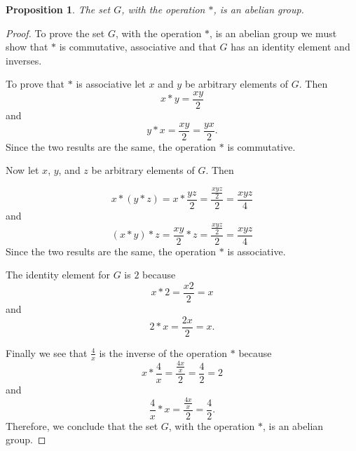 \documentclass[12pt]{article}   %
\newtheorem*{proposition}{Proposition}  %
\begin{document}
\begin{proposition}
The set $G$, with the operation $\ast$, is an abelian group.
\end{proposition}
\begin{proof}
To prove the set $G$, with the operation $\ast$, is an abelian group we must show that $\ast$ is commutative, associative and that $G$ has an identity element and inverses.

To prove that $*$ is associative let $x$ and $y$ be arbitrary elements of $G$. Then
\begin{equation*}
x * y = \frac{xy}{2}
\end{equation*}
and
\begin{equation*}
y * x = \frac{xy}{2} = \frac{yx}{2}.
\end{equation*}
Since the two results are the same, the operation $\ast$ is commutative.

Now let $x$, $y$, and $z$ be arbitrary elements of $G$. Then

\begin{equation*}
x * (y * z) = x * \frac{yz}{2} = \frac{\frac{xyz}{2}}{2} = \frac{xyz}{4}
\end{equation*}
and
\begin{equation*}
(x * y) * z = \frac{xy}{2} * z = \frac{\frac{xyz}{2}}{2} = \frac{xyz}{4}
\end{equation*}
Since the two results are the same, the operation $*$ is associative.

The identity element for $G$ is $2$ because
\[
x * 2 =\frac{x2}{2} = x
\]
and
\[
2 * x = \frac{2x}{2} = x.
\]

Finally we see that $\frac{4}{x}$ is the inverse of the operation $\ast$ because
\[
x * \frac{4}{x} = \frac{\frac{4x}{x}}{2} = \frac{4}{2} = 2
\]
and
\[
\frac{4}{x} * x = \frac{\frac{4x}{x}}{2} = \frac{4}{2}.
\]
Therefore, we conclude that the set $G$, with the operation $\ast$, is an abelian group.
\end{proof}
\end{document}
